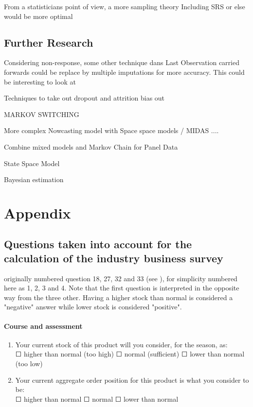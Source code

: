 \documentclass[12pt,a4paper,oneside]{book}
\begin{document}
From a statisticians point of view, a more sampling theory Including SRS or else would be more optimal


\section*{Further Research}


Considering non-response, some other technique dans Last Observation carried forwards could be replace by multiple imputations for more accuracy. This could be interesting to look at

Techniques to take out dropout and attrition bias out

MARKOV SWITCHING


More complex Nowcasting model with Space space models / MIDAS ....

Combine mixed models and Markov Chain for Panel Data \citep{de_haan-rietdijk_use_2017} 

State Space Model

Bayesian estimation \cite{bialowolski_bayesian_nodate}

\nocite{hlavac_stargazer:_2018}


 


  
\begin{appendix}
  \listoffigures
  \listoftables
\end{appendix}


\chapter*{Appendix}

\section*{Questions taken into account for the calculation of the industry business survey}
\label{Appendix: Question NS975 description}

originally numbered question 18, 27, 32 and 33 (see ), for simplicity numbered here as 1, 2, 3 and 4.
Note that the first question is interpreted in the opposite way from the three other. Having a higher stock than normal is considered a "negative" answer while lower stock is considered "positive".


\subsubsection*{Course and assessment}
\begin{enumerate}
    \item Your current stock of this product will you consider, for the season, as: \\
    $\Square$ higher than normal (too high) $\Square$ normal (sufficient) $\Square$ lower than normal (too low)
    
    \item Your current aggregate order position for this product is what you consider to be: \\
    $\Square$ higher than normal $\Square$ normal $\Square$ lower than normal
\end{enumerate}
\end{document}
